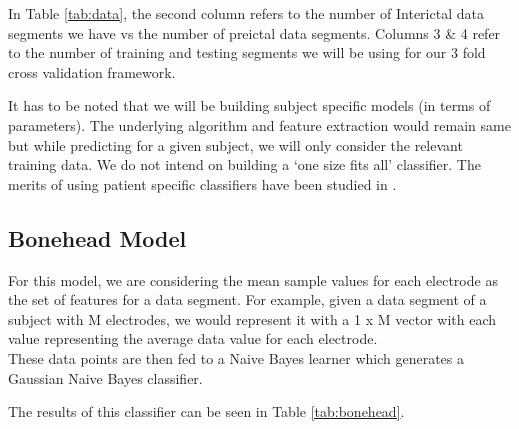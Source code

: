 \documentclass[a4paper]{article}
\begin{document}
In Table \ref{tab:data}, the second column refers to the number of Interictal data segments we have vs the number of preictal data segments. Columns 3 \& 4 refer to the number of training and testing segments we will be using for our 3 fold cross validation framework.

It has to be noted that we will be building subject specific models (in terms of parameters). The underlying algorithm and feature extraction would remain same but while predicting for a given subject, we will only consider the relevant training data. We do not intend on building a `one size fits all' classifier. The merits of using patient specific classifiers have been studied in \cite{yunpark}.

\subsection{Bonehead Model}
For this model, we are considering the mean sample values for each electrode as the set of features for a data segment. For example, given a data segment of a subject with M electrodes, we would represent it with a 1 x M vector with each value representing the average data value for each electrode. \\
These data points are then fed to a Naive Bayes learner which generates a Gaussian Naive Bayes classifier.

The results of this classifier can be seen in Table \ref{tab:bonehead}.


\begin{table}[!htbp]
\centering
{}
\caption{Performance of the bonehead model.}
\label{tab:bonehead}
\end{table}
\end{document}
